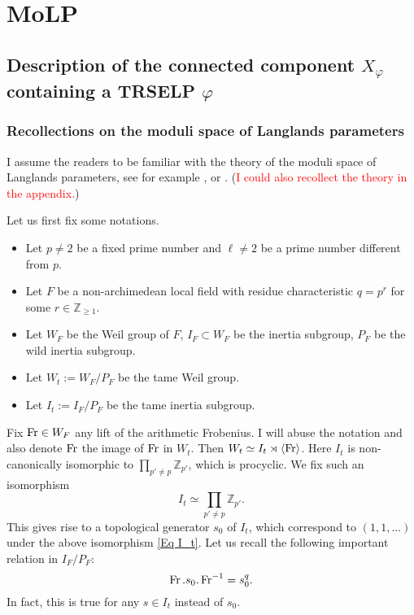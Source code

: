 


\chapter{MoLP}
	
	\section{Description of the connected component $X_{\varphi}$ containing a TRSELP $\varphi$}
	
	\subsection{Recollections on the moduli space of Langlands parameters}
	I assume the readers to be familiar with the theory of the moduli space of Langlands parameters, see for example \cite[Section 3 and Section 4]{dat2022ihes}, or \cite[Section 2 and Section 4]{dhkm2020moduli}. (\textcolor{red}{I could also recollect the theory in the appendix.})
	
	Let us first fix some notations.
	\begin{itemize}
		\item Let $p \neq 2$ be a fixed prime number and $\ell \neq 2$ be a prime number different from $p$. 
		\item Let $F$ be a non-archimedean local field with residue characteristic $q=p^r$ for some $r \in \mathbb{Z}_{\geq 1}$.
		\item Let $W_F$ be the Weil group of $F$, $I_F \subset W_F$ be the inertia subgroup, $P_F$ be the wild inertia subgroup.
		\item Let $W_t:=W_F/P_F$ be the tame Weil group.
		\item Let $I_t:=I_F/P_F$ be the tame inertia subgroup.
	\end{itemize}
	     Fix $\operatorname{Fr} \in W_F$ any lift of the arithmetic Frobenius. I will abuse the notation and also denote $\operatorname{Fr}$ the image of $\operatorname{Fr}$ in $W_t$. Then $W_t \simeq I_t \rtimes \left<\operatorname{Fr}\right>$. Here $I_t$ is non-canonically isomorphic to $\prod_{p'\neq p}\mathbb{Z}_{p'}$, which is procyclic. We fix such an isomorphism
	     \begin{equation}\label{Eq I_t}
	     	I_t \simeq \prod_{p'\neq p}\mathbb{Z}_{p'}.
	     \end{equation}
    This gives rise to a topological generator $s_0$ of $I_t$, which correspond to $(1, 1, ...)$ under the above isomorphism \eqref{Eq I_t}. Let us recall the following important relation in $I_F/P_F$:
	\begin{equation}\label{Eq Fr s_0}
		\operatorname{Fr}.s_0.\operatorname{Fr}^{-1}=s_0^q.
	\end{equation}
	In fact, this is true for any $s \in I_t$ instead of $s_0$.
	
